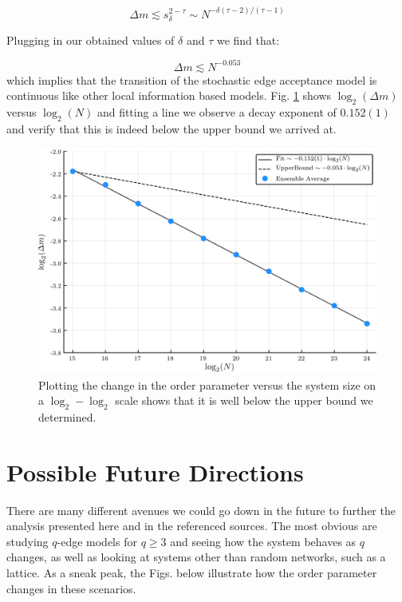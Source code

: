 \begin{equation}
	\Delta m \lesssim s_\delta^{2 - \tau} \sim N^{-\delta (\tau - 2) / (\tau - 1)}
\end{equation}

Plugging in our obtained values of $\delta$ and $\tau$ we find that:

\begin{equation}
	\Delta m \lesssim N^{-0.053}
\end{equation}
which implies that the transition of the stochastic edge acceptance model is continuous like other local information based models.
Fig. \ref{fig:delta_m_scaling} shows $\log_2(\Delta m)$ versus $\log_2(N)$ and fitting a line we observe a decay exponent of $0.152(1)$ and verify that this is indeed below the upper bound we arrived at.

\begin{figure}[H]
	\centering
	\includegraphics[width=350pt, clip]{images/delta_m_scaling.png}
	\caption{Plotting the change in the order parameter versus the system size on a $\log_2-\log_2$ scale shows that it is well below the upper bound we determined.}
	\label{fig:delta_m_scaling}
\end{figure}



\section{Possible Future Directions}
There are many different avenues we could go down in the future to further the analysis presented here and in the referenced sources.
The most obvious are studying $q$-edge models for $q \ge 3$ and seeing how the system behaves as $q$ changes, as well as looking at systems other than random networks, such as a lattice.
As a sneak peak, the Figs. below illustrate how the order parameter changes in these scenarios.

